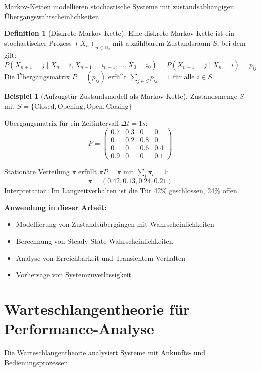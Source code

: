 ﻿\documentclass[a4paper,12pt]{report}
\theoremstyle{definition}
\newtheorem{definition}{Definition}[section]
\newtheorem{beispiel}{Beispiel}[section]
\begin{document}
Markov-Ketten \cite{stewart1994} modellieren stochastische Systeme mit zustandsabhängigen Übergangs\-wahrscheinlichkeiten.

\begin{definition}[Diskrete Markov-Kette]
	Eine diskrete Markov-Kette ist ein stochastischer Prozess $(X_n)_{n \in \mathbb{N}_0}$ mit abzählbarem Zustandsraum $S$, bei dem gilt:
	\[
	P(X_{n+1} = j \mid X_n = i, X_{n-1} = i_{n-1}, \ldots, X_0 = i_0) = P(X_{n+1} = j \mid X_n = i) = p_{ij}
	\]
	Die Übergangsmatrix $P = (p_{ij})$ erfüllt $\sum_{j \in S} p_{ij} = 1$ für alle $i \in S$.
\end{definition}

\begin{beispiel}[Aufzugstür-Zustandsmodell als Markov-Kette]
	Zustandsmenge $S$ mit $S = \{\text{Closed}, \text{Opening}, \text{Open}, \text{Closing}\}$
	
	Übergangsmatrix für ein Zeitintervall $\Delta t = 1s$:
	\[
	P = \begin{pmatrix}
		0.7 & 0.3 & 0 & 0 \\
		0 & 0.2 & 0.8 & 0 \\
		0 & 0 & 0.6 & 0.4 \\
		0.9 & 0 & 0 & 0.1
	\end{pmatrix}
	\]
	
	Stationäre Verteilung $\pi$ erfüllt $\pi P = \pi$ mit $\sum_i \pi_i = 1$:
	\[
	\pi = (0.42, 0.13, 0.24, 0.21)
	\]
	Interpretation: Im Langzeitverhalten ist die Tür 42\% geschlossen, 24\% offen.
\end{beispiel}

\textbf{Anwendung in dieser Arbeit:}
\begin{itemize}
	\item[-] Modellierung von Zustandsübergängen mit Wahrscheinlichkeiten
	\item[-] Berechnung von Steady-State-Wahrscheinlichkeiten
	\item[-] Analyse von Erreichbarkeit und Transientem Verhalten
	\item[-] Vorhersage von Systemzuverlässigkeit
\end{itemize}

\section{Warteschlangentheorie für Performance-Analyse}

Die Warteschlangentheorie \cite{kleinrock1975} analysiert Systeme mit Ankunfts- und Bedienungsprozessen.
\end{document}
